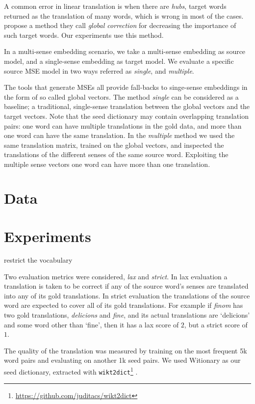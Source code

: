 \documentclass[11pt]{article}
\begin{document}
A common error in linear translation is when there are \emph{hubs}, target
words returned as the translation of many words, which is wrong in most of the
cases.  \cite{Dinu:2015} propose a method they call \emph{global correction}
for decreasing the importance of such target words. Our experiments use this
method.

In a multi-sense embedding scenario, we take a multi-sense embedding
as source model, and a single-sense embedding as target model.
We evaluate a specific source MSE model in two ways 
referred as \emph{single}, and \emph{multiple}.

The tools that generate MSEs all provide fall-backs to singe-sense embeddings
in the form of so called global vectors. The method \emph{single} can be
considered as a baseline; a traditional, single-sense translation between the
global vectors and the target vectors.  Note that the seed dictionary may
contain overlapping translation pairs: one word can have multiple translations
in the gold data, and more than one word can have the same translation.  In
the \emph{multiple} method we used the same translation matrix, trained on the
global vectors, and inspected the translations of the different senses of the
same source word.  Exploiting the multiple sense vectors one word can have
more than one translation.

\section{Data}

\section{Experiments}

restrict the vocabulary

Two evaluation metrics were considered, \emph{lax} and \emph{strict}. In lax
evaluation a translation is taken to be correct if any of the source word's
senses are translated into any of its gold translations.  In strict evaluation
the translations of the source word are expected to cover all of its gold
translations.  For example if {\it finom} has two gold translations, {\it
  delicions} and {\it fine}, and its actual translations are `delicions' and some
word other than `fine', then it has a lax score of $2$, but a strict score
of $1$.

The quality of the translation was measured by training on the most frequent 5k
word pairs and evaluating on another 1k seed pairs.  We used Witionary as our
seed dictionary, extracted with
\texttt{wikt2dict}\footnote{\url{https://github.com/juditacs/wikt2dict}}
\citep{Acs:2016}. 
\end{document}
